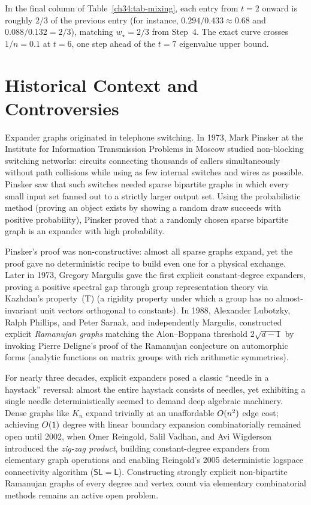 In the final column of Table~\ref{ch34:tab-mixing}, each entry from $t=2$ onward is roughly $2/3$ of the previous entry (for instance, $0.294/0.433 \approx 0.68$ and $0.088/0.132 = 2/3$), matching $w_\star=2/3$ from Step~4. The exact curve crosses $1/n=0.1$ at $t=6$, one step ahead of the $t=7$ eigenvalue upper bound.

\section{Historical Context and Controversies}
\label{ch34:history-context}

\begin{historybox}
Expander graphs originated in telephone switching. In 1973, Mark Pinsker at the Institute for Information Transmission Problems in Moscow studied non-blocking switching networks: circuits connecting thousands of callers simultaneously without path collisions while using as few internal switches and wires as possible. Pinsker saw that such switches needed sparse bipartite graphs in which every small input set fanned out to a strictly larger output set. Using the probabilistic method (proving an object exists by showing a random draw succeeds with positive probability), Pinsker proved that a randomly chosen sparse bipartite graph is an expander with high probability.

Pinsker's proof was non-constructive: almost all sparse graphs expand, yet the proof gave no deterministic recipe to build even one for a physical exchange. Later in 1973, Gregory Margulis gave the first explicit constant-degree expanders, proving a positive spectral gap through group representation theory via Kazhdan's property~(T) (a rigidity property under which a group has no almost-invariant unit vectors orthogonal to constants). In 1988, Alexander Lubotzky, Ralph Phillips, and Peter Sarnak, and independently Margulis, constructed explicit \emph{Ramanujan graphs} matching the Alon--Boppana threshold $2\sqrt{d-1}$ by invoking Pierre Deligne's proof of the Ramanujan conjecture on automorphic forms (analytic functions on matrix groups with rich arithmetic symmetries).

For nearly three decades, explicit expanders posed a classic ``needle in a haystack'' reversal: almost the entire haystack consists of needles, yet exhibiting a single needle deterministically seemed to demand deep algebraic machinery. Dense graphs like $K_n$ expand trivially at an unaffordable $O(n^2)$ edge cost; achieving $O(1)$ degree with linear boundary expansion combinatorially remained open until 2002, when Omer Reingold, Salil Vadhan, and Avi Wigderson introduced the \emph{zig-zag product}, building constant-degree expanders from elementary graph operations and enabling Reingold's 2005 deterministic logspace connectivity algorithm ($\mathsf{SL} = \mathsf{L}$). Constructing strongly explicit non-bipartite Ramanujan graphs of every degree and vertex count via elementary combinatorial methods remains an active open problem.
\end{historybox}

